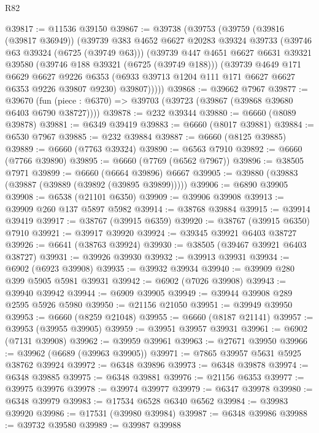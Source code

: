 \begin{lexlean}{R82}
\begin{coremodule}
@39817 := @11536 @39150
@39867 := @39738
    (@39753
      (@39759
        (@39816 (@39817 @36949))
        (@39739
          @383
          @4652
          @6627
          @20283
          @39324
          @39733
          (@39746 @63 @39324 (@6725 (@39749 @63)))
          (@39739
            @447
            @4651
            @6627
            @6631
            @39321
            @39580
            (@39746 @188 @39321 (@6725 (@39749 @188)))
            (@39739
              @4649
              @171
              @6629
              @6627
              @9226
              @6353
              (@6933 @39713 @1204 @111 @171 @6627 @6627 @6353 @9226 @39807 @9230)
              @39807)))))
@39868 := @39662 @7967
@39877 := @39670
    (fun (piece : @6370) => @39703 (@39723 (@39867 (@39868 @39680 @6403 @6790 @38727))))
@39878 := @232 @39344
@39880 := @6660 (@8089 @39878)
@39881 := @6349 @39419
@39883 := @6660 (@8017 @39881)
@39884 := @6530 @7967
@39885 := @232 @39884
@39887 := @6660 (@8125 @39885)
@39889 := @6660 (@7763 @39324)
@39890 := @6563 @7910
@39892 := @6660 (@7766 @39890)
@39895 := @6660 (@7769 (@6562 @7967))
@39896 := @38505 @7971
@39899 := @6660 (@6664 @39896) @6667
@39905 := @39880 (@39883 (@39887 (@39889 (@39892 (@39895 @39899)))))
@39906 := @6890 @39905
@39908 := @6538 (@21101 @6350)
@39909 := @39906 @39908
@39913 := @39909 @260 @137 @5897 @5982
@39914 := @38768 @39884
@39915 := @39914 @39419
@39917 := @38767 (@39915 @6359)
@39920 := @38767 (@39915 @6350) @7910
@39921 := @39917 @39920
@39924 := @39345 @39921 @6403 @38727
@39926 := @6641 (@38763 @39924)
@39930 := @38505 (@39467 @39921 @6403 @38727)
@39931 := @39926 @39930
@39932 := @39913 @39931
@39934 := @6902 (@6923 @39908)
@39935 := @39932 @39934
@39940 := @39909 @280 @399 @5905 @5981 @39931
@39942 := @6902 (@7026 @39908)
@39943 := @39940 @39942
@39944 := @6909 @39905
@39949 := @39944 @39908 @289 @2595 @5926 @5980
@39950 := @21156 @21050
@39951 := @39949 @39950
@39953 := @6660 (@8259 @21048)
@39955 := @6660 (@8187 @21141)
@39957 := @39953 (@39955 @39905)
@39959 := @39951 @39957 @39931
@39961 := @6902 (@7131 @39908)
@39962 := @39959 @39961
@39963 := @27671 @39950
@39966 := @39962 (@6689 (@39963 @39905))
@39971 := @7865 @39957 @5631 @5925 @38762 @39924
@39972 := @6348 @39896
@39973 := @6348 @39878
@39974 := @6348 @39885
@39975 := @6348 @39881
@39976 := @21156 @6353
@39977 := @39975 @39976
@39978 := @39974 @39977
@39979 := @6347 @39978
@39980 := @6348 @39979
@39983 := @17534 @6528 @6340 @6562
@39984 := @39983 @39920
@39986 := @17531 (@39980 @39984)
@39987 := @6348 @39986
@39988 := @39732 @39580
@39989 := @39987 @39988

\end{coremodule}
\end{lexlean}
